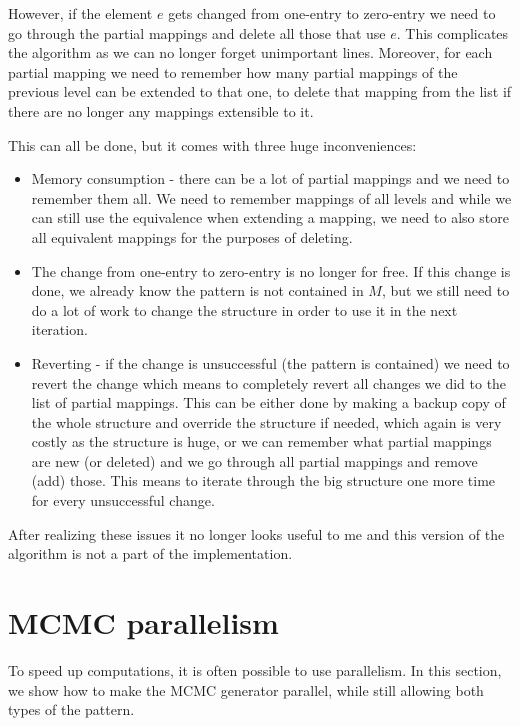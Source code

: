 However, if the element $e$ gets changed from one-entry to zero-entry we need to go through the partial mappings and delete all those that use $e$. This complicates the algorithm as we can no longer forget unimportant lines. Moreover, for each partial mapping we need to remember how many partial mappings of the previous level can be extended to that one, to delete that mapping from the list if there are no longer any mappings extensible to it.

This can all be done, but it comes with three huge inconveniences:
\begin{itemize}
\item Memory consumption - there can be a lot of partial mappings and we need to remember them all. We need to remember mappings of all levels and while we can still use the equivalence when extending a mapping, we need to also store all equivalent mappings for the purposes of deleting.
\item The change from one-entry to zero-entry is no longer for free. If this change is done, we already know the pattern is not contained in $M$, but we still need to do a lot of work to change the structure in order to use it in the next iteration.
\item Reverting - if the change is unsuccessful (the pattern is contained) we need to revert the change which means to completely revert all changes we did to the list of partial mappings. This can be either done by making a backup copy of the whole structure and override the structure if needed, which again is very costly as the structure is huge, or we can remember what partial mappings are new (or deleted) and we go through all partial mappings and remove (add) those. This means to iterate through the big structure one more time for every unsuccessful change.
\end{itemize}
After realizing these issues it no longer looks useful to me and this version of the algorithm is not a part of the implementation.

\section{MCMC parallelism}
\label{sect:parallel}
To speed up computations, it is often possible to use parallelism. In this section, we show how to make the MCMC generator parallel, while still allowing both types of the pattern.

